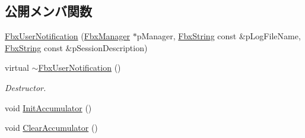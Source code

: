 \subsection*{公開メンバ関数}
\begin{DoxyCompactItemize}
\item 
\hyperlink{class_fbx_user_notification_a77144b139bd98ffa8fe879e79edf0374}{Fbx\+User\+Notification} (\hyperlink{class_fbx_manager}{Fbx\+Manager} $\ast$p\+Manager, \hyperlink{class_fbx_string}{Fbx\+String} const \&p\+Log\+File\+Name, \hyperlink{class_fbx_string}{Fbx\+String} const \&p\+Session\+Description)
\item 
virtual \hyperlink{class_fbx_user_notification_a74a886b6fd62277275a953841f19400b}{$\sim$\+Fbx\+User\+Notification} ()
\begin{DoxyCompactList}\small\item\em Destructor. \end{DoxyCompactList}\item 
void \hyperlink{class_fbx_user_notification_a1ed0d1420841b06af2b361dc0c3d7017}{Init\+Accumulator} ()
\item 
void \hyperlink{class_fbx_user_notification_a8e810f0860b43bf2b080f93acb3aaa50}{Clear\+Accumulator} ()
\end{DoxyCompactItemize}
